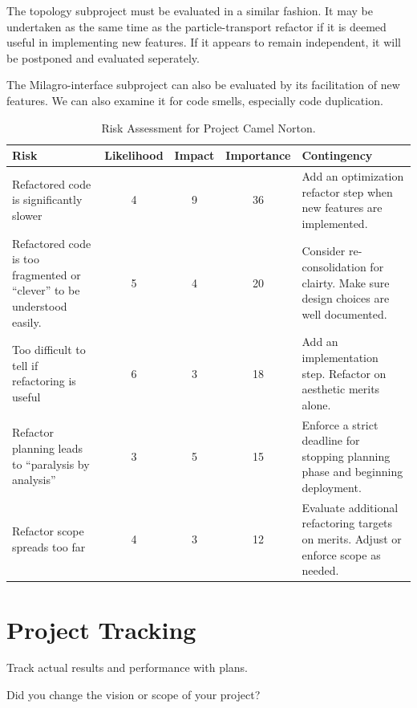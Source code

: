 \documentclass[11pt]{nmemo}
\begin{document}
The topology subproject must be evaluated in a similar fashion. It may
be undertaken as the same time as the particle-transport refactor if
it is deemed useful in implementing new features. If it appears to
remain independent, it will be postponed and evaluated seperately.

The Milagro-interface subproject can also be evaluated by its
facilitation of new features. We can also examine it for code smells,
especially code duplication.

\begin{table}[ht]
  \begin{center}
    \caption{Risk Assessment for Project Camel Norton.}
    \label{tab:risk}
    \begin{tabular}{|p{4.5cm}|c|c|c|p{4.5cm}|} 
    \hline
    Risk & Likelihood & Impact & Importance & Contingency \\ 
    \hline\hline
    Refactored code is significantly slower & 4 & 9 & 36 &
    Add an optimization refactor step when new features are
    implemented. \\ 
    \hline
    Refactored code is too fragmented or ``clever'' to be understood
    easily. 
    & 5 & 4 & 20 &
    Consider re-consolidation for clairty. Make sure design choices are
    well documented. \\
    \hline
    Too difficult to tell if refactoring is useful & 6 & 3 & 18 &
    Add an implementation step. Refactor on aesthetic merits alone. \\
    \hline
    Refactor planning leads to ``paralysis by analysis'' 
    & 3 & 5 & 15 &
    Enforce a strict deadline for stopping planning phase and
    beginning deployment. \\
    \hline
    Refactor scope spreads too far & 4 & 3 & 12 &
    Evaluate additional refactoring targets on merits. Adjust or
    enforce scope as needed. \\
    \hline
    \end{tabular}
  \end{center}
\end{table}

\newpage
\newpage
\section*{Project Tracking}

Track actual results and performance with plans.

   Did you change the vision or scope of your project? 
   
\end{document}
